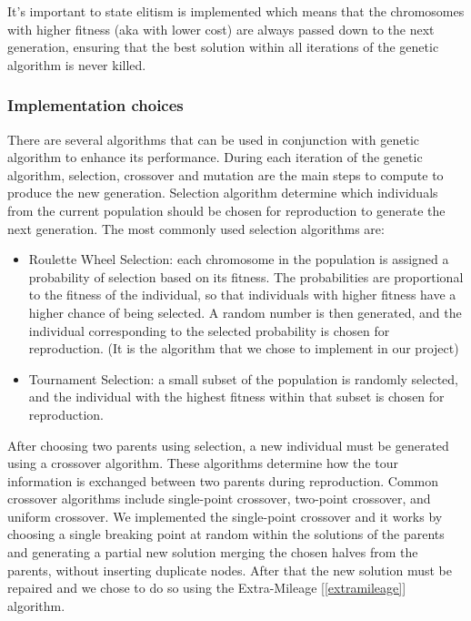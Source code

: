 It's important to state elitism is implemented which means that the chromosomes with higher fitness (aka with lower cost) are always passed down to the next generation, ensuring that the best solution within all iterations of the genetic algorithm is never killed. 

\subsubsection{Implementation choices}
There are several algorithms that can be used in conjunction with genetic algorithm to enhance its performance.
During each iteration of the genetic algorithm, selection, crossover and mutation are the main steps to compute to produce the new generation.
Selection algorithm determine which individuals from the current population should be chosen for reproduction to generate the next generation. The most commonly used selection algorithms are:

\begin{itemize}
    \item Roulette Wheel Selection: each chromosome in the population is assigned a probability of selection based on its fitness. The probabilities are proportional to the fitness of the individual, so that individuals with higher fitness have a higher chance of being selected. A random number is then generated, and the individual corresponding to the selected probability is chosen for reproduction. (It is the algorithm that we chose to implement in our project)
    \item Tournament Selection: a small subset of the population is randomly selected, and the individual with the highest fitness within that subset is chosen for reproduction.
\end{itemize}

After choosing two parents using selection, a new individual must be generated using a crossover algorithm. 
These algorithms determine how the tour information is exchanged between two parents during reproduction. Common crossover algorithms include single-point crossover, two-point crossover, and uniform crossover.
We implemented the single-point crossover and it works by choosing a single breaking point at random within the solutions of the parents and generating a partial new solution merging the chosen halves from the parents, without inserting duplicate nodes.
After that the new solution must be repaired and we chose to do so using the Extra-Mileage [\ref{extramileage}] algorithm.

